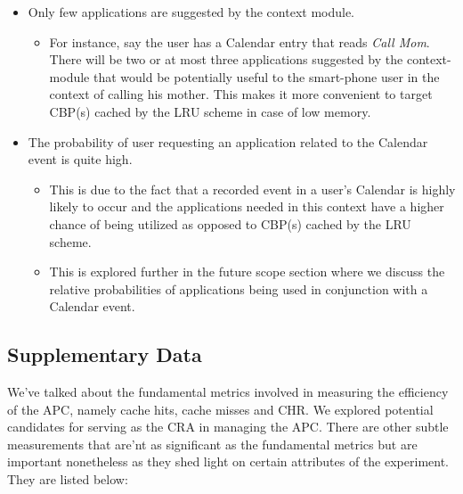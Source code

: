 \documentclass[12pt]{uthesis-v12}  %
\begin{document}
					\begin{itemize}
						
						\item Only few applications are suggested by the context module.
						
							\begin{itemize}
								\item For instance, say the user has a Calendar entry that reads {\em Call Mom}. There will be two or at most three applications suggested by the context-module that would be potentially useful to the smart-phone user in the context of calling his mother. This makes it more convenient to target CBP(s) cached by the LRU scheme in case of low memory.
							\end{itemize}
							
						\item The probability of user requesting an application related to the Calendar event is quite high.
						
							\begin{itemize}
								
								\item This is due to the fact that a recorded event in a user's Calendar is highly likely to occur and the applications needed in this context have a higher chance of being utilized as opposed to CBP(s) cached by the LRU scheme.
								
								\item This is explored further in the future scope section where we discuss the relative probabilities of applications being used in conjunction with a Calendar event.
								
							\end{itemize}
								
					\end{itemize}  
					
		\subsection{Supplementary Data}
			We've talked about the fundamental metrics involved in measuring the efficiency of the APC, namely cache hits, cache misses and CHR. We explored potential candidates for serving as the CRA in managing the APC. There are other subtle measurements that are'nt as significant as the fundamental metrics but are important nonetheless as they shed light on certain attributes of the experiment. They are listed below:
			
\end{document}
